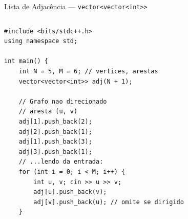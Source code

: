 \documentclass[aspectratio=169,10pt]{beamer}
\begin{document}
\begin{frame}[fragile]{Lista de Adjacência --- \texttt{vector<vector<int>>}}
  \begin{columns}[t]
      \begin{tcolorbox}[caixaCodigo]
        \begin{lstlisting}[style=cppstyle]
#include <bits/stdc++.h>
using namespace std;

int main() {
    int N = 5, M = 6; // vertices, arestas
    vector<vector<int>> adj(N + 1);

    // Grafo nao direcionado
    // aresta (u, v)
    adj[1].push_back(2);
    adj[2].push_back(1);
    adj[1].push_back(3);
    adj[3].push_back(1);
    // ...lendo da entrada:
    for (int i = 0; i < M; i++) {
        int u, v; cin >> u >> v;
        adj[u].push_back(v);
        adj[v].push_back(u); // omite se dirigido
    }


\end{lstlisting}
\end{tcolorbox}
\end{columns}
\end{frame}
\end{document}
